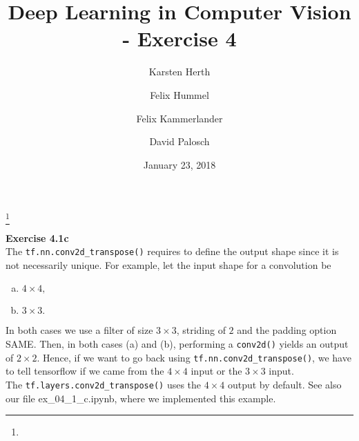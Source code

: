 \documentclass[a4paper, reqno]{amsart}
\theoremstyle{definition}
\numberwithin{equation}{section}
\begin{document}
\title[Exercise 4]
{Deep Learning in Computer Vision - Exercise 4}
\author{Karsten Herth}
\author{Felix Hummel}
\author{Felix Kammerlander}
\author{David Palosch}
\thanks{}
\date{January 23, 2018}

\maketitle

{\bf Exercise 4.1c} \\	The \texttt{tf.nn.conv2d_transpose()} requires to define the output shape since it is not necessarily unique. For example, let the input shape for a convolution be
	\begin{enumerate}
	[(a)]
		\item $4 \times 4,$
		\item $3 \times 3.$
	\end{enumerate}
	In both cases we use a filter of size $3 \times 3$, striding of $2$ and the padding option SAME. Then, in both cases (a) and (b), performing a \texttt{conv2d()} yields
	an output of $2 \times 2.$ Hence, if we want to go back using \texttt{tf.nn.conv2d_transpose()}, we have to tell tensorflow if we came from the $4 \times 4$ input or the
	$3 \times 3$ input. \\
	The \texttt{tf.layers.conv2d_transpose()} uses the $4 \times 4$ output by default. See also our file ex_04_1_c.ipynb, where we implemented this example.
\end{document}
